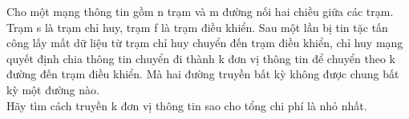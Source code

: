 Cho một mạng thông tin gồm n trạm và m đường nối hai chiều giữa các trạm. Trạm s là trạm chỉ huy, trạm f là trạm điều khiển. Sau một lần bị tin tặc tấn công lấy mất dữ liệu từ trạm chỉ huy chuyển đến trạm điều khiển, chỉ huy mạng quyết định chia thông tin chuyển đi thành k đơn vị thông tin để chuyển theo k đường đến trạm điều khiển. Mà hai đường truyền bất kỳ không được chung bất kỳ một đường nào.
\\Hãy tìm cách truyền k đơn vị thông tin sao cho tổng chi phí là nhỏ nhất.